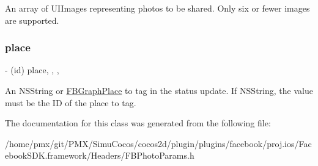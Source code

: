 An array of U\+I\+Images representing photos to be shared. Only six or fewer images are supported. \mbox{\label{interfaceFBPhotoParams_a109c4a005dd1830e5e3d735eddb3672d}} 
\subsubsection{\texorpdfstring{place}{place}}
{\footnotesize\ttfamily -\/ (id) place\hspace{0.3cm}{\ttfamily [read]}, {\ttfamily [write]}, {\ttfamily [nonatomic]}, {\ttfamily [copy]}}

An N\+S\+String or \hyperlink{protocolFBGraphPlace-p}{F\+B\+Graph\+Place} to tag in the status update. If N\+S\+String, the value must be the ID of the place to tag. 

The documentation for this class was generated from the following file\+:\begin{DoxyCompactItemize}
\item 
/home/pmx/git/\+P\+M\+X/\+Simu\+Cocos/cocos2d/plugin/plugins/facebook/proj.\+ios/\+Facebook\+S\+D\+K.\+framework/\+Headers/F\+B\+Photo\+Params.\+h\end{DoxyCompactItemize}

